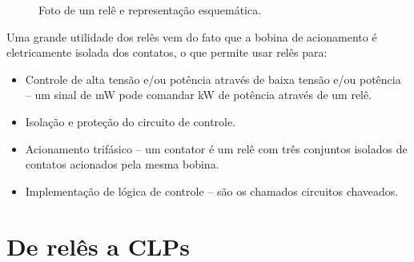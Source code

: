 \begin{figure}[!h]
  \centering
  \caption{Foto de um relê e representação esquemática.}
\end{figure}

Uma grande utilidade dos relês vem do fato que a bobina de acionamento é eletricamente isolada dos contatos, o que permite usar relês para:
\begin{itemize}
  \item Controle de alta tensão e/ou potência através de baixa tensão e/ou potência -- um sinal de mW pode comandar kW de potência através de um relê.
  \item Isolação e proteção do circuito de controle.
  \item Acionamento trifásico -- um contator é um relê com três conjuntos isolados de contatos acionados pela mesma bobina.
  \item Implementação de lógica de controle -- são os chamados circuitos chaveados.
\end{itemize}
\section{De relês a CLPs}

